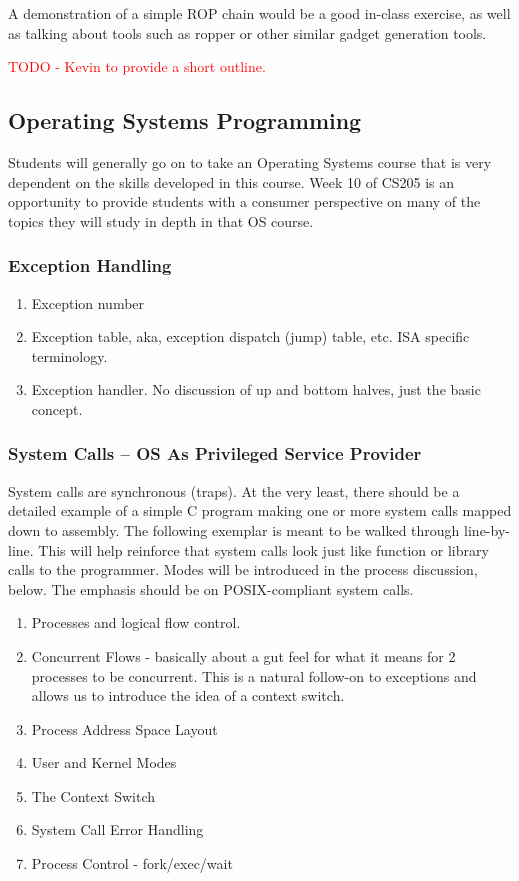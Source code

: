 \documentclass[12pt,letterpaper]{article}
\begin{document}
    A demonstration of a simple ROP chain would be a good in-class exercise, as well as talking about tools such as ropper or other similar gadget generation tools.

	\textcolor{red}{TODO - Kevin to provide a short outline.}

	\subsection{Operating Systems Programming}

	Students will generally go on to take an Operating Systems course that is very dependent on the skills developed in this course. Week 10 of CS205 is an opportunity to provide students with a consumer perspective on many of the topics they will study in depth in that OS course.
	
	\subsubsection{Exception Handling}
	\begin{enumerate}
		\item Exception number
		\item Exception table, aka, exception dispatch (jump) table, etc. ISA specific terminology.
		\item Exception handler. No discussion of up and bottom halves, just the basic concept.
	\end{enumerate}
		
	\subsubsection{System Calls -- OS As Privileged Service Provider}

	System calls are synchronous (traps). At the very least, there should be a detailed example of a simple C program making one or more system calls mapped down to assembly. The following exemplar is meant to be walked through line-by-line. This will help reinforce that system calls look just like function or library calls to the programmer. Modes will be introduced in the process discussion, below. The emphasis should be on POSIX-compliant system calls.
	
	\begin{enumerate}
		\item Processes and logical flow control.
		\item Concurrent Flows - basically about a gut feel for what it means for 2 processes to be concurrent.  This is a natural follow-on to exceptions and allows us to introduce the idea of a context switch.
		\item Process Address Space Layout
		\item User and Kernel Modes
		\item The Context Switch
		\item System Call Error Handling
		\item Process Control - fork/exec/wait
	\end{enumerate}
\end{document}
